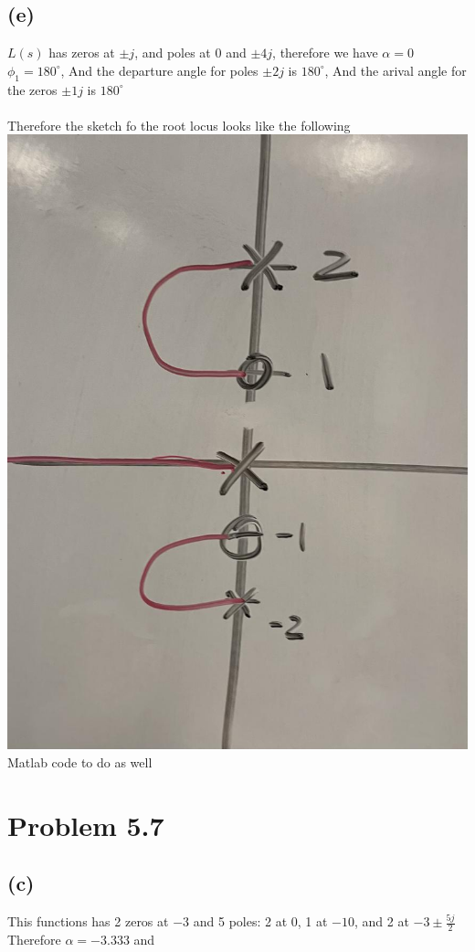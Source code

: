 \documentclass[12pt]{article}
\begin{document}
\subsection*{(e)}
$L(s)$ has zeros at $\pm j$, and poles at $0$ and $\pm4j$, therefore we have $\alpha=0$
$\phi_{1}=180^{\circ}$, 
And the departure angle for poles $\pm2j$ is $180^{\circ}$, And the arival angle for the zeros $\pm1j$ is $180^{\circ}$\\\\
Therefore the sketch fo the root locus looks like the following
\\
\includegraphics[scale=.15]{Problem1Sketch2.jpg}
\\
Matlab code to do as well
\section*{Problem 5.7}
\subsection*{(c)}
This functions has 2 zeros at $-3$ and 5 poles: 2 at $0$, 1 at $-10$, and 2 at $-3\pm\frac{5j}{2}$
Therefore $\alpha=-3.333$ and 
\end{document}
